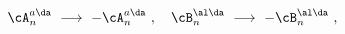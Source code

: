 \begin{equation}
\cA^{a\da}_n ~ \longrightarrow~ - \cA^{a\da}_n~, ~~~
\cB^{\al\da}_n ~ \longrightarrow~ - \cB^{\al\da}_n~,
\end{equation}

